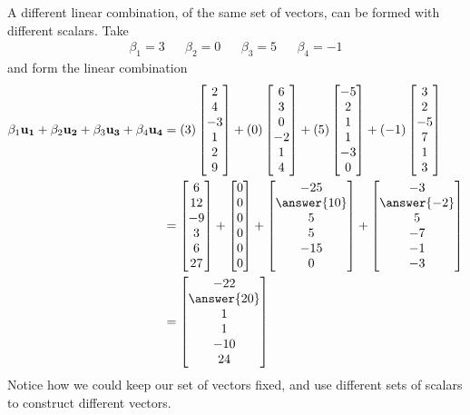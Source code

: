 \documentclass{ximera}
\begin{document}
\begin{example}
  A different linear combination, of the same set of vectors, can be
  formed with different scalars. Take
  \begin{align*}
    \beta_1=3&&\beta_2=0&&\beta_3=5&&\beta_4=-1
  \end{align*}
  and form the linear combination
  \begin{align*}
    \beta_1\vect{u_1}+ \beta_2\vect{u_2}+ \beta_3\vect{u_3}+ \beta_4\vect{u_4}
    &=
      (3)\colvector{2\\4\\-3\\1\\2\\9}+
      (0)\colvector{6\\3\\0\\-2\\1\\4}+
      (5)\colvector{-5\\2\\1\\1\\-3\\0}+
      (-1)\colvector{3\\2\\-5\\7\\1\\3}\\
    &=
      \colvector{6\\12\\-9\\3\\6\\27}+
      \colvector{0\\0\\0\\0\\0\\0}+
      \colvector{-25\\\answer{10}\\5\\5\\-15\\0}+
      \colvector{-3\\\answer{-2}\\5\\-7\\-1\\-3} \\
    &=
      \colvector{-22\\\answer{20}\\1\\1\\-10\\24}
  \end{align*}
  Notice how we could keep our set of vectors fixed, and use different
  sets of scalars to construct different vectors.  


\end{example}
\end{document}
